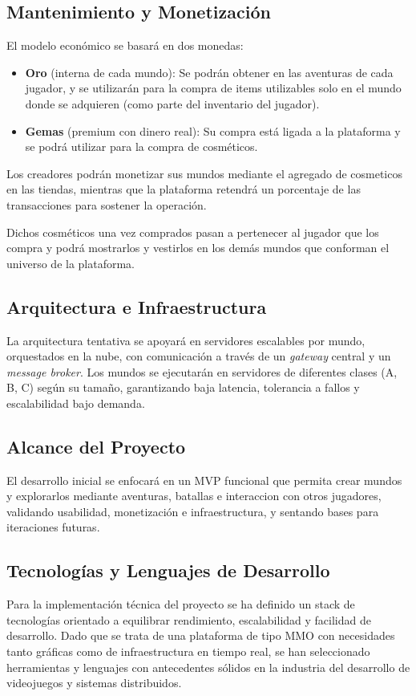 \subsection{Mantenimiento y Monetización}
El modelo económico se basará en dos monedas:
\begin{itemize}
    \item \textbf{Oro} (interna de cada mundo): Se podrán obtener en las aventuras de cada jugador, y se utilizarán para la compra de items utilizables
        solo en el mundo donde se adquieren (como parte del inventario del jugador).
    \item \textbf{Gemas} (premium con dinero real): Su compra está ligada a la plataforma y se podrá utilizar para la compra de cosméticos.
\end{itemize}

Los creadores podrán monetizar sus mundos mediante el agregado de cosmeticos en las tiendas, 
mientras que la plataforma retendrá un porcentaje de las transacciones para sostener la operación.

Dichos cosméticos una vez comprados pasan a pertenecer al jugador que los compra y podrá mostrarlos y vestirlos en los demás mundos que conforman el universo de la plataforma.

\subsection{Arquitectura e Infraestructura}
La arquitectura tentativa se apoyará en servidores escalables por mundo, orquestados en la nube, 
con comunicación a través de un \textit{gateway} central y un \textit{message broker}. 
Los mundos se ejecutarán en servidores de diferentes clases (A, B, C) según su tamaño, 
garantizando baja latencia, tolerancia a fallos y escalabilidad bajo demanda.

\subsection{Alcance del Proyecto}
El desarrollo inicial se enfocará en un MVP funcional que permita crear mundos y explorarlos mediante aventuras, batallas e interaccion con otros jugadores, 
validando usabilidad, monetización e infraestructura, y sentando bases para iteraciones futuras.

\subsection{Tecnologías y Lenguajes de Desarrollo}
Para la implementación técnica del proyecto se ha definido un stack de tecnologías orientado a equilibrar rendimiento, escalabilidad y facilidad de desarrollo.
Dado que se trata de una plataforma de tipo MMO con necesidades tanto gráficas como de infraestructura en tiempo real, se han seleccionado herramientas y lenguajes 
con antecedentes sólidos en la industria del desarrollo de videojuegos y sistemas distribuidos.
\vspace{0.25cm}

